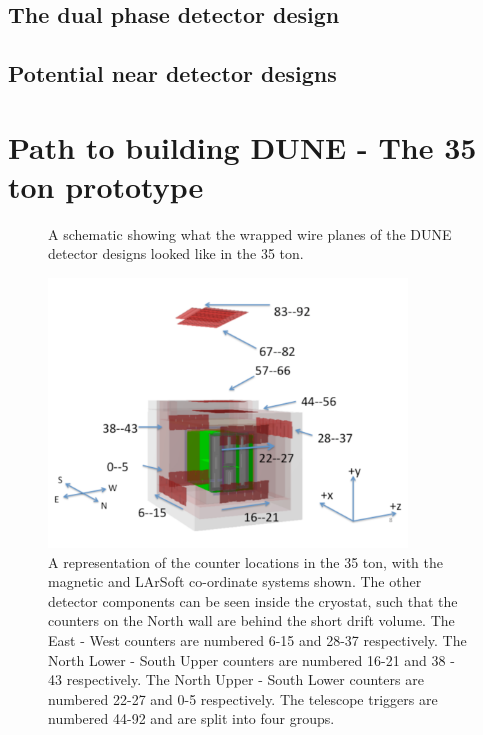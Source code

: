 \subsection{The dual phase detector design} \label{sec:DUNEDetector_DP}

\subsection{Potential near detector designs} \label{sec:DUNEDetector_Near}

\section{Path to building DUNE - The 35 ton prototype} \label{sec:The35tonDetector}  %

\begin{figure}[h!]
  \centering
  \caption[The wrapped wires of the 35 ton]{A schematic showing what the wrapped wire planes of the DUNE detector designs looked like in the 35 ton.}
  \label{fig:35tonWireGeom}
\end{figure}

\begin{figure}[h!]
  \centering
  \includegraphics[width=0.85\textwidth]{35tonFullDetect}
  \caption[A representation of the counter locations in the 35 ton]
          {A representation of the counter locations in the 35 ton, with the magnetic and LArSoft co-ordinate systems shown. The other detector components can be seen inside the cryostat, such that the counters on the North wall are behind the short drift volume. The East - West counters are numbered 6-15 and 28-37 respectively. The North Lower - South Upper counters are numbered 16-21 and 38 - 43 respectively. The North Upper - South Lower counters are numbered 22-27 and 0-5 respectively. The telescope triggers are numbered 44-92 and are split into four groups.}
  \label{fig:35tonCounterLoc}
\end{figure}

